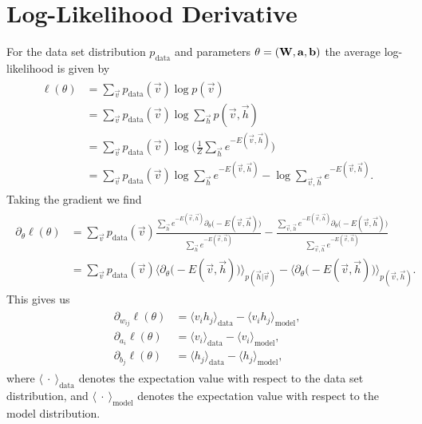 \section{Log-Likelihood Derivative}\label{app:rbm_log_likelihood_derivation}
For the data set distribution \( p_\text{data} \) and parameters \( \theta = (\mathbf{W}, \mathbf{a}, \mathbf{b}) \) the average log-likelihood is given by
\begin{align}
\begin{split}
    \ell(\theta)
        &= \sum_{\vec{v}} p_{\text{data}}(\vec{v}) \log p(\vec{v}) \\
        &= \sum_{\vec{v}} p_{\text{data}}(\vec{v}) \log \sum_\vec{h} p(\vec{v},\vec{h}) \\
        &= \sum_{\vec{v}} p_{\text{data}}(\vec{v}) \log \bigg(\frac{1}{Z} \sum_\vec{h} e^{-E(\vec{v},\vec{h})}\bigg) \\
        &= \sum_{\vec{v}} p_{\text{data}}(\vec{v}) \log \sum_\vec{h} e^{-E(\vec{v},\vec{h})} - \log \sum_{\vec{v},\vec{h}} e^{-E(\vec{v},\vec{h})}.
\end{split}
\end{align}
Taking the gradient we find
\begin{align}
\begin{split}
    \partial_{\theta} \ell(\theta)
        &= \sum_{\vec{v}} p_{\text{data}}(\vec{v}) \frac{\sum_\vec{h} e^{-E(\vec{v},\vec{h})} \partial_{\theta}\big( -E(\vec{v},\vec{h}) \big) }{\sum_\vec{h} e^{-E(\vec{v},\vec{h})}}
            - \frac{\sum_{\vec{v},\vec{h}} e^{-E(\vec{v},\vec{h})} \partial_{\theta}\big( -E(\vec{v},\vec{h}) \big) }{\sum_{\vec{v},\vec{h}} e^{-E(\vec{v},\vec{h})}} \\
        &= \sum_{\vec{v}} p_{\text{data}}(\vec{v}) \Big\langle \partial_{\theta}\big( -E(\vec{v},\vec{h}) \big) \Big\rangle_{p(\vec{h}|\vec{v})}
        - \Big\langle \partial_{\theta}\big( -E(\vec{v},\vec{h}) \big) \Big\rangle_{p(\vec{v},\vec{h})}.
\end{split}
\end{align}
This gives us
\begin{align}
\begin{split}
    \partial_{w_{ij}} \ell(\theta)
        &= \langle v_i h_j \rangle_{\text{data}} - \langle v_i h_j \rangle_{\text{model}}, \\
    \partial_{a_i} \ell(\theta)
        &= \langle v_i \rangle_{\text{data}} - \langle v_i \rangle_{\text{model}}, \\
    \partial_{b_j} \ell(\theta)
        &= \langle h_j \rangle_{\text{data}} - \langle h_j \rangle_{\text{model}},
\end{split}
\end{align}
where \( \langle \ \cdot \ \rangle_{\text{data}} \) denotes the expectation value with respect to the data set distribution, and \( \langle \ \cdot \ \rangle_{\text{model}} \) denotes the expectation value with respect to the model distribution.

